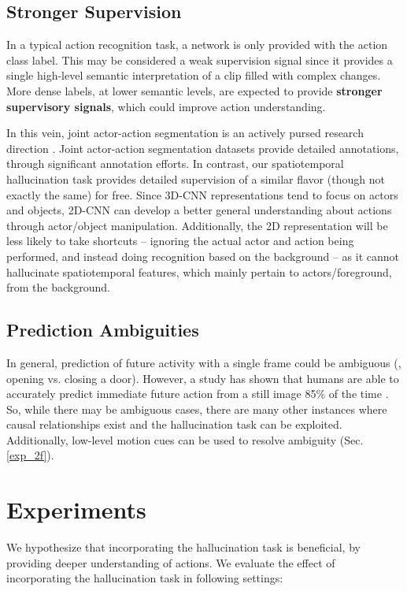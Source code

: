 \documentclass[10pt,twocolumn,letterpaper]{article}
\begin{document}
\subsection{Stronger Supervision}
In a typical action recognition task, a network is only provided with the action class label. This may be considered a weak supervision signal since it provides a single high-level semantic interpretation of a clip filled with complex changes.  More dense labels, at lower semantic levels, are expected to provide \textbf{stronger supervisory signals}, which could improve action understanding.

In this vein, joint actor-action segmentation is an actively pursed research direction \cite{jji, gavril, yan2017, kalogeit, xu2016}.  Joint actor-action segmentation datasets \cite{a2d} provide detailed annotations, through significant annotation efforts.  In contrast, our spatiotemporal hallucination task provides detailed supervision of a similar flavor (though not exactly the same) for free.  Since 3D-CNN representations tend to focus on actors and objects, 2D-CNN can develop a better general understanding about actions through actor/object manipulation.  Additionally, the 2D representation will be less likely to take shortcuts -- ignoring the actual actor and action being performed, and instead doing recognition based on the background \cite{sports1m, ar_wo_human} -- as it cannot hallucinate spatiotemporal features, which mainly pertain to actors/foreground, from the background.

\subsection{Prediction Ambiguities}
In general, prediction of future activity with a single frame could be ambiguous (\eg, opening vs. closing a door).  However, a study has shown that humans are able to accurately predict immediate future action from a still image 85\% of the time \cite{cv_anticipating}.  So, while there may be ambiguous cases, there are many other instances where causal relationships exist and the hallucination task can be exploited.  Additionally, low-level motion cues can be used to resolve ambiguity (Sec. \ref{exp_2f}).  \section{Experiments}
We hypothesize that incorporating the hallucination task is beneficial, by providing deeper understanding of actions. We evaluate the effect of incorporating the hallucination task in following settings:
\end{document}
